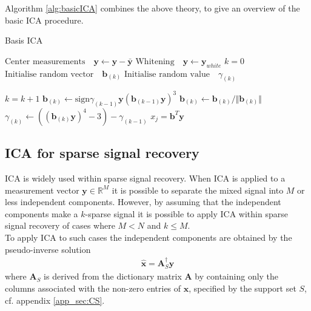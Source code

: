 Algorithm \ref{alg:basicICA} combines the above theory, to give an overview of the basic ICA procedure. 
\begin{algorithm}[H]
\caption{Basis ICA}
\begin{algorithmic}[1]
			\State $\text{Center measurements} \quad \textbf{y} \gets \textbf{y} - \bar{\textbf{y}}$
			\State $\text{Whitening} \quad \textbf{y}\gets \textbf{y}_{white}$ 
			\EndProcedure  
			\State
			\State$k=0$            
            \State$\text{Initialise random vector} \quad \textbf{b}_{(k)}$ 
            \State$\text{Initialise random value} \quad \gamma_{(k)}$
            
               		\State $k = k+1$
                	\State $\textbf{b}_{(k)} \gets \text{sign}\gamma_{(k-1)} \textbf{y}(\textbf{b}_{(k-1)} \textbf{y})^3$
                	\State $\textbf{b}_{(k)} \gets \textbf{b}_{(k)}/\Vert \textbf{b}_{(k)} \Vert $ 
                	\State $\gamma_{(k)} \gets ((\textbf{b}_{(k)} \textbf{y})^4 - 3) - \gamma_{(k-1)} $
          		\EndWhile
          		\State $x_{j} = \textbf{b}^T\textbf{y}$
          	\EndFor
          	
            \EndProcedure
        \end{algorithmic} 
        \label{alg:basicICA}
\end{algorithm}

\subsection{ICA for sparse signal recovery}
ICA is widely used within sparse signal recovery.   
When ICA is applied to a measurement vector $\textbf{y}\in\mathbb{R}^{M}$ it is possible to separate the mixed signal into $M$ or less independent components. 
However, by assuming that the  independent components make a $k$-sparse signal it is possible to apply ICA within sparse signal recovery of cases where $M < N$ and $k \leq M$. 
\\
To apply ICA to such cases the independent components are obtained by the pseudo-inverse solution 
\begin{align*}
\hat{\mathbf{x}} = \mathbf{A}_S^{\dagger} \mathbf{y}
\end{align*}
where $\mathbf{A}_S$ is derived from the dictionary matrix $\mathbf{A}$ by containing only the columns associated with the non-zero entries of $\textbf{x}$, specified by the support set $S$, cf. appendix \ref{app_sec:CS}. 

 


